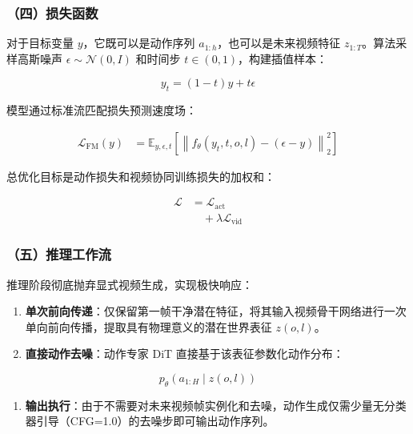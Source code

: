 \hypertarget{ux56dbux635fux5931ux51fdux6570-2}{%
\subsubsection{（四）损失函数}\label{ux56dbux635fux5931ux51fdux6570-2}}

对于目标变量 \(y\)，它既可以是动作序列 \(a_{1:h}\)，也可以是未来视频特征 \(z_{1:T}\)。算法采样高斯噪声 \(\epsilon \sim \mathcal{N}(0,I)\) 和时间步 \(t \in (0,1)\)，构建插值样本：

\[
y_t = (1-t)y + t\epsilon
\]

模型通过标准流匹配损失预测速度场：

\[
\begin{aligned}
\mathcal{L}_{\mathrm{FM}}(y)
&= \mathbb{E}_{y,\epsilon,t}
\left[
\left\|
f_\theta(y_t,t,o,l) - (\epsilon-y)
\right\|_2^2
\right]
\end{aligned}
\]

总优化目标是动作损失和视频协同训练损失的加权和：

\[
\begin{aligned}
\mathcal{L}
&= \mathcal{L}_{\mathrm{act}}
\\
&\quad + \lambda \mathcal{L}_{\mathrm{vid}}
\end{aligned}
\]

\hypertarget{ux4e94ux63a8ux7406ux5de5ux4f5cux6d41-1}{%
\subsubsection{（五）推理工作流}\label{ux4e94ux63a8ux7406ux5de5ux4f5cux6d41-1}}

推理阶段彻底抛弃显式视频生成，实现极快响应：

\begin{enumerate}
\def\labelenumi{\arabic{enumi}.}
\tightlist
\item
  \textbf{单次前向传递}：仅保留第一帧干净潜在特征，将其输入视频骨干网络进行一次单向前向传播，提取具有物理意义的潜在世界表征 \(z(o,l)\)。
\item
  \textbf{直接动作去噪}：动作专家 DiT 直接基于该表征参数化动作分布：
\end{enumerate}

\[
p_\theta(a_{1:H}\mid z(o,l))
\]

\begin{enumerate}
\def\labelenumi{\arabic{enumi}.}
\setcounter{enumi}{2}
\tightlist
\item
  \textbf{输出执行}：由于不需要对未来视频帧实例化和去噪，动作生成仅需少量无分类器引导（CFG=1.0）的去噪步即可输出动作序列。
\end{enumerate}

